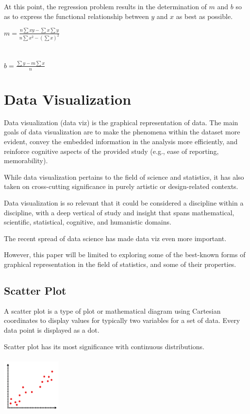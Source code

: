 \documentclass{article}
\begin{document}
At this point, the regression problem results in the determination of $m$ and $b$ so as to express the functional relationship between $y$ and $x$ as best as possible.

$\displaystyle m = \frac{n \sum{xy} - \sum{x}\sum{y}}{n\sum{x^2} - (\sum{x})^2}$ \\ \mbox{} \\
\mbox{} \\
$\displaystyle b = \frac{\sum{y} - m\sum{x}}{n}$

\clearpage
\section{Data Visualization}
Data visualization (data viz) is the graphical representation of data. 
The main goals of data visualization are to make the phenomena within the dataset more evident, convey the embedded information in the analysis more efficiently, and reinforce cognitive aspects of the provided study (e.g., ease of reporting, memorability).

While data visualization pertains to the field of science and statistics, it has also taken on cross-cutting significance in purely artistic or design-related contexts.

Data visualization  is so relevant that it could be considered a discipline within a discipline, with a deep vertical of study and insight that spans mathematical, scientific, statistical, cognitive, and humanistic domains. 

The recent spread of data science has made data viz even more important.

However, this paper will be limited to exploring some of the best-known forms of graphical representation in the field of statistics, and some of their properties.

\subsection{Scatter Plot}
A scatter plot is a type of plot or mathematical diagram using Cartesian coordinates to display values for typically two variables for a set of data. Every data point is displayed as a dot.

Scatter plot has its most significance with continuous distributions. 

\includegraphics[width=3cm, height=3cm]{plot_chart}
\end{document}
